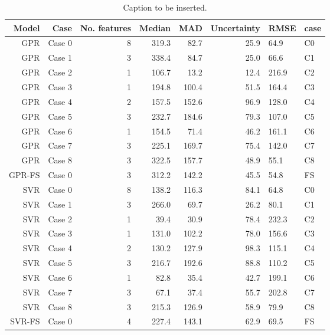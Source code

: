 \begin{table}
\centering
\caption{Caption to be inserted.}
\label{uncertainty_table__mc}
\begin{tabular}{rrrrrr}
\toprule
  Model &    Case &  No. features &  Median &   MAD &  Uncertainty &  RMSE & case \\
\midrule
    GPR &  Case 0 &             8 &   319.3 &  82.7 &         25.9 &  64.9 &   C0 \\
    GPR &  Case 1 &             3 &   338.4 &  84.7 &         25.0 &  66.6 &   C1 \\
    GPR &  Case 2 &             1 &   106.7 &  13.2 &         12.4 & 216.9 &   C2 \\
    GPR &  Case 3 &             1 &   194.8 & 100.4 &         51.5 & 164.4 &   C3 \\
    GPR &  Case 4 &             2 &   157.5 & 152.6 &         96.9 & 128.0 &   C4 \\
    GPR &  Case 5 &             3 &   232.7 & 184.6 &         79.3 & 107.0 &   C5 \\
    GPR &  Case 6 &             1 &   154.5 &  71.4 &         46.2 & 161.1 &   C6 \\
    GPR &  Case 7 &             3 &   225.1 & 169.7 &         75.4 & 142.0 &   C7 \\
    GPR &  Case 8 &             3 &   322.5 & 157.7 &         48.9 &  55.1 &   C8 \\
 GPR-FS &  Case 0 &             3 &   312.2 & 142.2 &         45.5 &  54.8 &   FS \\
    SVR &  Case 0 &             8 &   138.2 & 116.3 &         84.1 &  64.8 &   C0 \\
    SVR &  Case 1 &             3 &   266.0 &  69.7 &         26.2 &  80.1 &   C1 \\
    SVR &  Case 2 &             1 &    39.4 &  30.9 &         78.4 & 232.3 &   C2 \\
    SVR &  Case 3 &             1 &   131.0 & 102.2 &         78.0 & 156.6 &   C3 \\
    SVR &  Case 4 &             2 &   130.2 & 127.9 &         98.3 & 115.1 &   C4 \\
    SVR &  Case 5 &             3 &   216.7 & 192.6 &         88.8 & 110.2 &   C5 \\
    SVR &  Case 6 &             1 &    82.8 &  35.4 &         42.7 & 199.1 &   C6 \\
    SVR &  Case 7 &             3 &    67.1 &  37.4 &         55.7 & 202.8 &   C7 \\
    SVR &  Case 8 &             3 &   215.3 & 126.9 &         58.9 &  79.9 &   C8 \\
 SVR-FS &  Case 0 &             4 &   227.4 & 143.1 &         62.9 &  69.5 &   FS \\
\bottomrule
\end{tabular}
\end{table}
